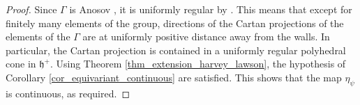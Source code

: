 \documentclass[12pt]{amsbook}%
\theoremstyle{definition}
\theoremstyle{remark}
\numberwithin{section}{chapter}
\numberwithin{subsection}{section}
\numberwithin{figure}{chapter}
\DeclareMathOperator{\Th}{Th}
\def\cF{{\mathscr{F}}}
\def\Ga{\Gamma}
\def\ga{\gamma}
\begin{document}
{{\begin{proof} 
Since $\Gamma$ is Anosov , it is uniformly regular by \cite[Theorem 3.41]{manicures}. This means that except for finitely many elements of the group, directions of the Cartan projections of the elements of the $\Ga$ are at uniformly positive distance away from the walls. 
In particular, the Cartan projection is contained in a uniformly regular polyhedral cone in $\mathfrak{h}^+$.  
Using Theorem \ref{thm_extension_harvey_lawson}, the hypothesis of 
 Corollary \ref{cor_equivariant_continuous} are satisfied. This shows that the map $\eta_\psi$ is continuous, as required.
% 
%

\end{proof}}}
\end{document}
